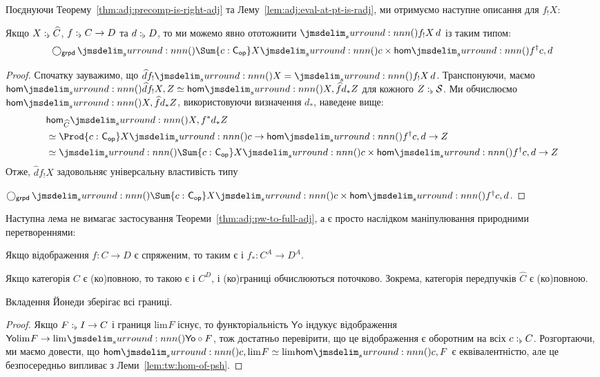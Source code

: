 \documentclass[12pt]{article}
\newcommand{\Space}{\mathcal{S}}
\newcommand{\PSH}[1]{\widehat{#1}}
\newcommand{\Yo}{\mathsf{Yo}}
\newcommand{\Equiv}{\mathrel{\simeq}}
\newcommand{\GM}{\flat}
\newcommand{\OM}{\mathsf{op}}
\let\prn\DelimPrn
\newcommand{\Lim}[1]{\mathrm{lim}_{#1}}
\begin{document}
Поєднуючи Теорему~\ref{thm:adj:precomp-is-right-adj} та Лему~\ref{lem:adj:eval-at-pt-is-radj}, ми отримуємо наступне описання для $f_!X$:

\begin{cor}
  \label{cor:adj:push-pull-formula}
  Якщо $\DeclVar{X}{\GM}{\PSH{C}}$, $\DeclVar{f}{\GM}{C \to D}$ та $\DeclVar{d}{\GM}{D}$, то ми можемо явно ототожнити $\prn{f_!X}\,d$ із таким типом:
  \[
    \Grpdify \prn{\Sum{c : \Modify[\OM]{C}} X\prn{c} \times \Hom{f^\dagger c}{d}}
  \]
\end{cor}
\begin{proof}
  Спочатку зауважимо, що $\PSH{d}f_!\prn{X} = \prn{f_!X}\,d$. Транспонуючи, маємо $\Hom{\PSH{d}f_!X}{Z} \Equiv \Hom{X}{\PSH{f}d_*Z}$ для кожного $\DeclVar{Z}{\GM}{\Space}$. Ми обчислюємо $\Hom{X}{\PSH{f}d_*Z}$, використовуючи визначення $d_*$, наведене вище:
  \begin{align*}
    &\Hom[\PSH{C}]{X}{f^*d_*Z}
    \\
    &\Equiv \Prod{\DeclVar{c}{}{\Modify[\OM]{C}}} X\prn{c} \to \Hom{f^\dagger c}{d} \to Z
    \\
    &\Equiv \prn{\Sum{\DeclVar{c}{}{\Modify[\OM]{C}}} X\prn{c} \times \Hom{f^\dagger c}{d}} \to Z
  \end{align*}
  Отже, $\PSH{d}f_!X$ задовольняє універсальну властивість типу

 $\Grpdify \prn{\Sum{\DeclVar{c}{}{\Modify[\OM]{C}}} X\prn{c} \times \Hom{f^\dagger c}{d}}$.
\end{proof}

Наступна лема не вимагає застосування Теореми~\ref{thm:adj:pw-to-full-adj}, а є просто наслідком маніпулювання природними перетвореннями:
\begin{lem}
  \label{lem:adj:comp}
  Якщо відображення $f : C \to D$ є спряженим, то таким є і $f_* : C^A \to D^A$.
\end{lem}

\begin{cor}
  \label{cor:adj:limits-are-pointwise}
  Якщо категорія $C$ є (ко)повною, то такою є і $C^D$, і (ко)границі обчислюються поточково. Зокрема, категорія передпучків $\PSH{C}$ є (ко)повною.
\end{cor}
\begin{cor}
  \label{cor:adj:yo-preserves-limits}
  Вкладення Йонеди зберігає всі границі.
\end{cor}
\begin{proof}
  Якщо $\DeclVar{F}{\GM}{I \to C}$ і границя $\Lim{} F$ існує, то функторіальність $\Yo$ індукує відображення $\Yo{\Lim{} F} \to \Lim{}\prn{\Yo \circ F}$, тож достатньо перевірити, що це відображення є оборотним на всіх $\DeclVar{c}{\GM}{C}$. Розгортаючи, ми маємо довести, що $\Hom{c}{\Lim{} F} \Equiv \Lim{} \Hom{c}{F}$ є еквівалентністю, але це безпосередньо випливає з Леми~\ref{lem:tw:hom-of-psh}.
\end{proof}
\end{document}

